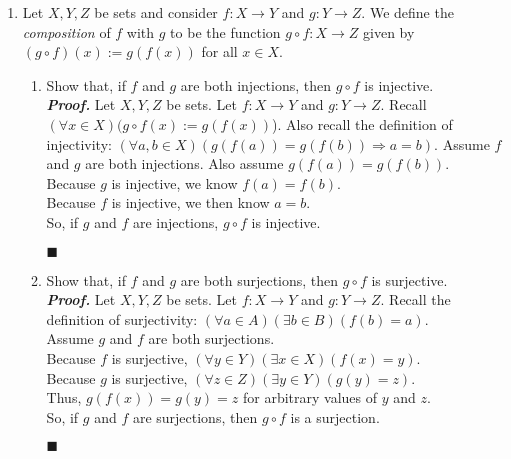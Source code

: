 \documentclass[11pt,a4paper]{article}
\begin{document}
\begin{enumerate}
    \item 
    Let $X, Y, Z $ be sets and consider $f : X \rightarrow Y $ and $g : Y \rightarrow Z $. 
    We define the \emph{composition} of $f$ with $g$ to be the function $g \circ f : X \rightarrow Z$ given by 
    $(g \circ f)(x) := g(f(x)) $ for all $x \in X$.
    \begin{enumerate}
        \item 
        Show that, if $f$ and $g$ are both injections, then $g \circ f $ is injective.  \\
        \emph{\textbf{Proof.}} Let $X, Y, Z $ be sets. Let $f: X \rightarrow Y$ and $g: Y \rightarrow Z $. Recall $(\forall x \in X)(g \circ f (x):= g(f(x)) $).
        Also recall the definition of injectivity: $(\forall a, b \in X)(g(f(a)) = g(f(b)) \Rightarrow a  = b) $.
        Assume $f$ and $g$ are both injections. Also assume $g(f(a)) = g(f(b)) $. \\
        Because $g$ is injective, we know $f(a) = f(b) $. \\
        Because $f$ is injective, we then know $a = b$. \\
        So, if $g$ and $f$ are injections, $g \circ f $ is injective.  
        \begin{flushright}
            $\blacksquare$
        \end{flushright}

        \item 
        Show that, if $f$ and $g$ are both surjections, then $g \circ f $ is surjective. \\
        \emph{\textbf{Proof.}} Let $X, Y, Z $ be sets. Let $f: X \rightarrow Y$ and $g: Y \rightarrow Z $. Recall the definition of surjectivity: $(\forall a \in A)(\exists b \in B)(f(b) = a) $. \\
        Assume $g $ and $f$ are both surjections. \\
        Because $f$ is surjective, $(\forall y \in Y)(\exists x \in X)(f(x) = y) $. \\
        Because $g$ is surjective, $(\forall z \in Z)(\exists y \in Y)(g(y) = z) $. \\
        Thus, $g(f(x)) = g(y) = z $ for arbitrary values of $y$ and $z$. \\
        So, if $g $ and $f$ are surjections, then $g \circ f  $ is a surjection.
        \begin{flushright}
            $\blacksquare$
        \end{flushright}


\end{enumerate}
\end{enumerate}
\end{document}
